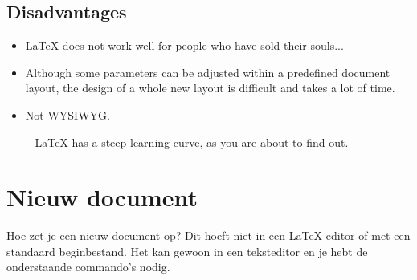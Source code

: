 \subsection{Disadvantages}
\begin{itemize}
	\renewcommand{\labelitemi}{\(-\)}
	\item \LaTeX{} does not work well for people who have sold their souls...
	\item Although some parameters can be adjusted within a predefined document
	layout, the design of a whole new layout is difficult and takes a lot of
	time.
	\item Not WYSIWYG.
	\item[--] \LaTeX{} has a steep learning curve, as you are about to find out.
\end{itemize}


\section{Nieuw document}

Hoe zet je een nieuw document op? Dit hoeft niet in een \LaTeX-editor of met een
standaard beginbestand. Het kan gewoon in een teksteditor en je hebt de
onderstaande commando's nodig.


